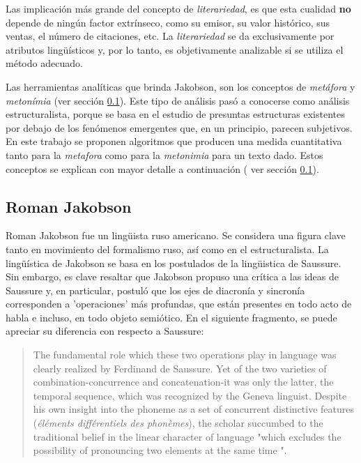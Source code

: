 \documentclass[12pt,letterpaper,twoside]{article}
\begin{document}
Las implicación más grande del concepto de \emph{literariedad}, es que
esta cualidad \textbf{no} depende de ningún factor extrínseco, como su
emisor, su valor histórico, sus ventas, el número de citaciones,
etc. La \emph{literariedad} se da exclusivamente por atributos
lingüísticos y, por lo tanto, es objetivamente analizable si se
utiliza el método adecuado.

Las herramientas analíticas que brinda Jakobson, son los conceptos
de \emph{metáfora} y \emph{metonímia} (ver sección \ref{sec:org13e31a2}).  Este tipo
de análisis pasó a conocerse como análisis estructuralista, porque
se basa en el estudio de presuntas estructuras existentes por debajo
de los fenómenos emergentes que, en un principio, parecen
subjetivos. En este trabajo se proponen algoritmos que producen una
medida cuantitativa tanto para la \emph{metafora} como para la \emph{metonimia}
para un texto dado. Estos conceptos se explican con mayor
detalle a continuación ( ver sección \ref{sec:org13e31a2}).


\subsection{Roman Jakobson}
\label{sec:org13e31a2}

Roman Jakobson fue un lingüista ruso americano. Se considera una
figura clave tanto en movimiento del formalismo ruso, así como en
el estructuralista.  La lingüística de Jakobson se basa en los
postulados de la lingüistica de Saussure. Sin embargo, es clave
resaltar que Jakobson propuso una crítica a las ideas de Saussure
y, en particular, postuló que los ejes de diacronía y sincronía
corresponden a 'operaciones' más profundas, que están presentes en
todo acto de habla e incluso, en todo objeto semiótico. En el
siguiente fragmento, se puede apreciar su diferencia con respecto
a Saussure:

\begin{quote}
The fundamental role which these two operations play in language
was clearly realized by Ferdinand de Saussure. Yet of the two
varieties of combination-concurrence and concatenation-it was only
the latter, the temporal sequence, which was recognized by the
Geneva linguist. Despite his own insight into the phoneme as a set
of concurrent distinctive features (\emph{éléments différentiels
des phonèmes}), the scholar succumbed to the traditional belief
in the linear character of language "which excludes the
possibility of pronouncing two elements at the same time ".
\cite[99]{jakobson1956two}
\end{quote}
\end{document}
